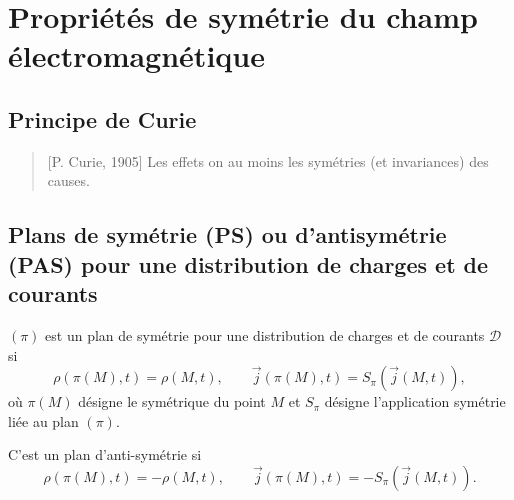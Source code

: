 \section[Propriétés de symétrie]{Propriétés de symétrie du champ électromagnétique}

    \subsection{Principe de Curie}

        \begin{quote}[P. Curie, 1905]
            Les effets on au moins les symétries (et invariances) des causes.
        \end{quote}

    \subsection{Plans de symétrie (PS) ou d'antisymétrie (PAS) pour une distribution de charges et de courants}

        $(\pi)$ est un plan de symétrie pour une distribution de charges et de courants $\mathcal{D}$ si 
        \begin{equation*}
            \rho(\pi(M),t)=\rho(M,t),\qquad \vec{j}(\pi(M),t)=S_{\pi}(\vec{j}(M,t)),
        \end{equation*}
        où $\pi(M)$ désigne le symétrique du point $M$ et $S_{\pi}$ désigne l'application symétrie liée au plan $(\pi)$.

        C'est un plan d'anti-symétrie si
        \begin{equation*}
            \rho(\pi(M),t)=-\rho(M,t),\qquad \vec{j}(\pi(M),t)=-S_{\pi}(\vec{j}(M,t)).
        \end{equation*}


